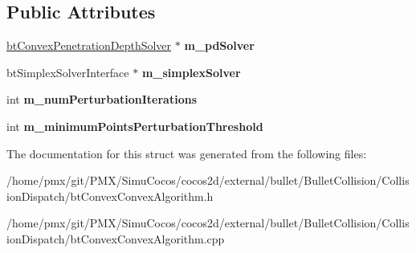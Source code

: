 \subsection*{Public Attributes}
\begin{DoxyCompactItemize}
\item 
\mbox{\label{structbtConvexConvexAlgorithm_1_1CreateFunc_ac1f060c112e637485232d0809ceb5861}} 
\hyperlink{classbtConvexPenetrationDepthSolver}{bt\+Convex\+Penetration\+Depth\+Solver} $\ast$ {\bfseries m\+\_\+pd\+Solver}
\item 
\mbox{\label{structbtConvexConvexAlgorithm_1_1CreateFunc_a156344df95bf6171fd3fcdbaebf6fc9d}} 
bt\+Simplex\+Solver\+Interface $\ast$ {\bfseries m\+\_\+simplex\+Solver}
\item 
\mbox{\label{structbtConvexConvexAlgorithm_1_1CreateFunc_a24eea415bbe847cff58abeeb5755eb8b}} 
int {\bfseries m\+\_\+num\+Perturbation\+Iterations}
\item 
\mbox{\label{structbtConvexConvexAlgorithm_1_1CreateFunc_aa5c11136faeea1f82ab05a16014d4278}} 
int {\bfseries m\+\_\+minimum\+Points\+Perturbation\+Threshold}
\end{DoxyCompactItemize}


The documentation for this struct was generated from the following files\+:\begin{DoxyCompactItemize}
\item 
/home/pmx/git/\+P\+M\+X/\+Simu\+Cocos/cocos2d/external/bullet/\+Bullet\+Collision/\+Collision\+Dispatch/bt\+Convex\+Convex\+Algorithm.\+h\item 
/home/pmx/git/\+P\+M\+X/\+Simu\+Cocos/cocos2d/external/bullet/\+Bullet\+Collision/\+Collision\+Dispatch/bt\+Convex\+Convex\+Algorithm.\+cpp\end{DoxyCompactItemize}
